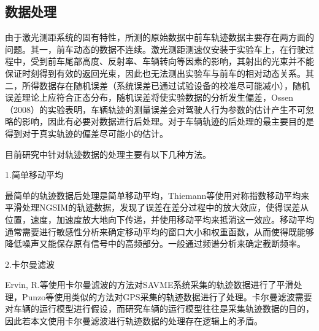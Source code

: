 \subsection{数据处理}


由于激光测距系统的固有特性，所测的原始数据中前车轨迹数据主要存在两方面的问题。其一，前车动态的数据不连续。激光测距测速仪安装于实验车上，在行驶过程中，受到前车尾部高度、反射率、车辆转向等因素的影响，其射出的光束并不能保证时刻得到有效的返回光束，因此也无法测出实验车与前车的相对动态关系。其二，所得数据存在随机误差（系统误差已通过试验设备的校准尽可能减小），随机误差理论上应符合正态分布，随机误差将使实验数据的分析发生偏差，Ossen（2008）\cite{Ossen2008}的实验表明，车辆轨迹的测量误差会对驾驶人行为参数的估计产生不可忽略的影响，因此有必要对数据进行后处理。对于车辆轨迹的后处理的最主要目的是得到对于真实轨迹的偏差尽可能小的估计。

目前研究中针对轨迹数据的处理主要有以下几种方法。

1.简单移动平均


最简单的轨迹数据后处理是简单移动平均，Thiemann等\cite{Thiemann2008}使用对称指数移动平均来平滑处理NGSIM的轨迹数据，发现了误差在差分过程中的放大效应，使得误差从位置，速度，加速度放大地向下传递，并使用移动平均来抵消这一效应。移动平均通常需要进行敏感性分析来确定移动平均的窗口大小和权重函数，从而使得既能够降低噪声又能保存原有信号中的高频部分。一般通过频谱分析来确定截断频率。


2.卡尔曼滤波

Ervin, R.等\cite{Ervin2000}使用卡尔曼滤波的方法对SAVME系统采集的轨迹数据进行了平滑处理，Punzo等\cite{Punzo2009}使用类似的方法对GPS采集的轨迹数据进行了处理。卡尔曼滤波需要对车辆的运行模型进行假设，而研究车辆的运行模型往往是采集轨迹数据的目的，因此若本文使用卡尔曼滤波进行轨迹数据的处理存在逻辑上的矛盾。

